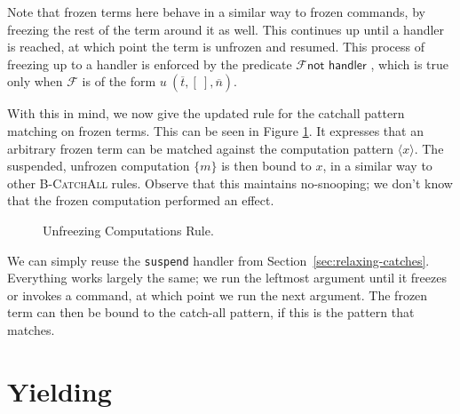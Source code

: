 \documentclass[msc,deptreport,cs]{infthesis} %
\newcommand{\code}[1]{\lstinline{#1}}
\newcommand\figscale{0.85}
\DeclarePairedDelimiter{\ceil}{\lceil}{\rceil}
\newcommand{\many}{\overline}
\newcommand{\bindbase}[4]{{#3} \mathbin{:} {#2} \mathbin{#1} {#4}}
\newcommand{\adj}{\Delta}
\newcommand{\sigs}{\Sigma}
\newcommand{\thunk}[1]{\{{#1}\}}
\newcommand{\effin}[1]{\langle {#1} \rangle}
\newcommand{\effout}[1]{[{#1}]}
\newcommand{\EF}{\mathcal{F}}
\newcommand{\venv}{\theta}
\newcommand{\freeze}{\ceil}
\newcommand{\cu}{\mathord{\uparrow}}
\newcommand{\sigyields}[1]
           {\mathbin{\text{-\!-\!}[{\text{\scriptsize ${#1}$}}]\,}}
\newcommand{\bindsc}[5]{\bindbase{\sigyields{#4}}{#2 \leftarrow #3}{#1}{#5}}
\newcommand{\adjact}[3]{{#1}\vdash{#2}\dashv{#3}}
\begin{document}
Note that frozen terms here behave in a similar way to frozen commands, by
freezing the rest of the term around it as well. This continues up until a
handler is reached, at which point the term is unfrozen and resumed. This
process of freezing up to a handler is enforced by the predicate $\EF \textsf{
  not handler }$, which is true only when $\EF$ is of the form $u~(\many{t},
[~], \many{n})$.

With this in mind, we now give the updated rule for the catchall pattern
matching on frozen terms. This can be seen in Figure \ref{fig:catchall-freeze}.
It expresses that an arbitrary frozen term can be matched against the
computation pattern $\effin{x}$. The suspended, unfrozen computation $\thunk{m}$
is then bound to $x$, in a similar way to other \textsc{B-CatchAll} rules.
Observe that this maintains no-snooping; we don't know that the frozen
computation performed an effect.

\begin{figure}[t]
\flushleft

\scalebox{\figscale}{%
\centering
\begin{mathpar}

\inferrule[B-CatchAll-Freeze]
  {\adjact{\sigs}{\adj}{\sigs'}}
  {\bindsc{\effin{x}}{\effin{\adj}A}{\freeze{m}}{\sigs}{[\cu (\thunk{m}\mathord{:}\thunk{\effout{\sigs'}A})/x]}}
\end{mathpar}
}

\caption{Unfreezing Computations Rule.}
\label{fig:catchall-freeze}
\end{figure}


We can simply reuse the \code{suspend} handler from
Section~\ref{sec:relaxing-catches}. Everything works largely the same; we run the
leftmost argument until it freezes or invokes a command, at which point we run
the next argument. The frozen term can then be bound to the catch-all pattern, if
this is the pattern that matches.


\section{Yielding}
\label{sec:inserting-yields}
\end{document}
